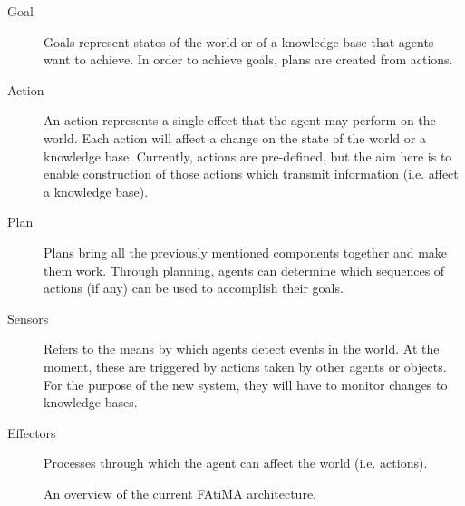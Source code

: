 \documentclass{article}
\begin{document}
\begin{description}
\item[Goal]
  Goals represent states of the world or of a knowledge base that agents want
  to achieve.  In order to achieve goals, plans are created from actions.

\item[Action]
  An action represents a single effect that the agent may perform on the world.
  Each action will affect a change on the state of the world or a knowledge base.
  Currently, actions are pre-defined, but the aim here is to enable construction
  of those actions which transmit information (i.e. affect a knowledge base).

\item[Plan]
  Plans bring all the previously mentioned components together and make them
  work.  Through planning, agents can determine which sequences of actions (if any)
  can be used to accomplish their goals.

\item[Sensors]
  Refers to the means by which agents detect events in the world.  At the moment,
  these are triggered by actions taken by other agents or objects.  For the 
  purpose of the new system, they will have to monitor changes to knowledge bases.

\item[Effectors]
  Processes through which the agent can affect the world (i.e. actions).

\end{description}

\begin{figure}[htbp!]
  \caption{An overview of the current FAtiMA architecture\cite{Paiva2005}. }
  \label{fatima_diagram}
\end{figure}
\end{document}
